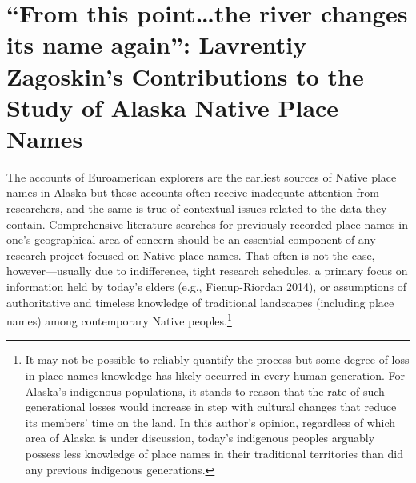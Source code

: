 \chapter[Lavrentiy Zagoskin’s Contributions to the Study of Alaska Native Place Names]{\vspace{-25pt}“From this point…the river changes its name again”: Lavrentiy Zagoskin’s Contributions to the Study of Alaska Native Place Names}






\def\authorlast{Pratt}

\renewcommand{\beginchapter}{\pageref{pratt-ch-begin}}
\renewcommand{\finishchapter}{\pageref{pratt-ch-end}}
\label{pratt-ch-begin}



\thispagestyle{firststyle}



The accounts of Euroamerican explorers are the earliest sources of Native place names in Alaska but those accounts often receive inadequate attention from researchers, and the same is true of contextual issues related to the data they contain. Comprehensive literature searches for previously recorded place names in one’s geographical area of concern should be an essential component of any research project focused on Native place names. That often is not the case, however---usually due to indifference, tight research schedules, a primary focus on information held by today’s elders (e.g., Fienup-Riordan 2014), or assumptions of authoritative and timeless knowledge of traditional landscapes (including place names) among contemporary Native peoples.\footnote{It may not be possible to reliably quantify the process but some degree of loss in place names knowledge has likely occurred in every human generation. For Alaska’s indigenous populations, it stands to reason that the rate of such generational losses would increase in step with cultural changes that reduce its members’ time on the land. In this author’s opinion, regardless of which area of Alaska is under discussion, today’s indigenous peoples arguably possess less knowledge of place names in their traditional territories than did any previous indigenous generations.}

